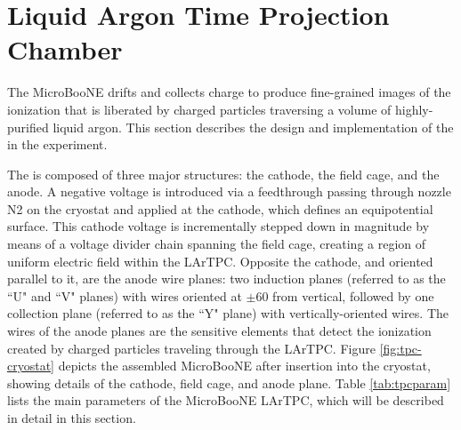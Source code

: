 \section{Liquid Argon Time Projection Chamber}
\label{sec:tpc-all}

The MicroBooNE \lartpc drifts and collects charge to produce fine-grained images of the ionization that is liberated by charged particles traversing a volume of highly-purified liquid argon.  This section describes the design and implementation of the \lartpc in the experiment.

The \lartpc is composed of three major structures: the cathode, the field cage, and the anode. A negative voltage is introduced via a feedthrough passing through nozzle N2 on the cryostat and applied at the cathode, which defines an equipotential surface.  This cathode voltage is incrementally stepped down in magnitude by means of a voltage divider chain spanning the field cage, creating a region of uniform electric field within the LArTPC. Opposite the cathode, and oriented parallel to it, are the anode wire planes: two induction planes (referred to as the ``U" and ``V" planes) with wires oriented at $\pm60$ from vertical, followed by one collection plane (referred to as the ``Y" plane) with vertically-oriented wires.   The wires of the anode planes are the sensitive elements that detect the ionization created by charged particles traveling through the LArTPC.  Figure \ref{fig:tpc-cryostat} depicts the assembled MicroBooNE \lartpc after insertion into the cryostat, showing details of the cathode, field cage, and anode plane.  Table \ref{tab:tpcparam} lists the main parameters of the MicroBooNE LArTPC, which will be described in detail in this section.  


